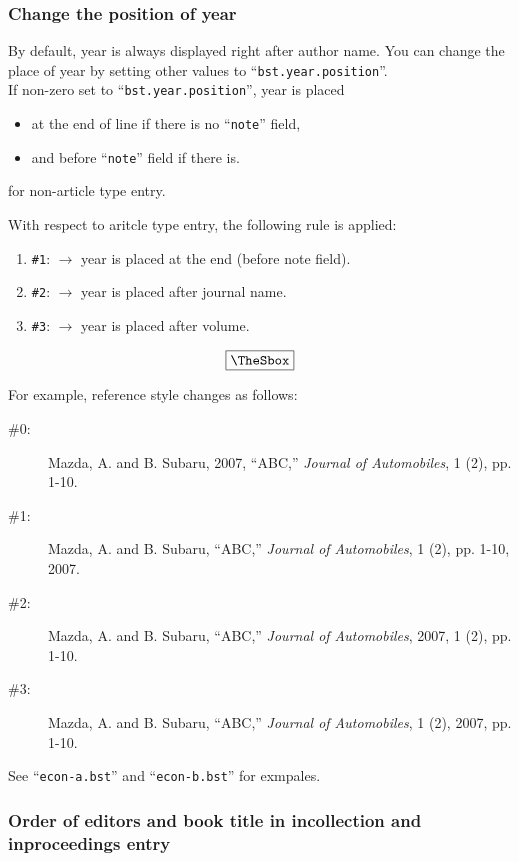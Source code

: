 \documentclass[10pt]{article}
\newenvironment{Frame}%
{\setlength{\fboxsep}{15pt}
\setlength{\mylength}{\linewidth}%
\addtolength{\mylength}{-2\fboxsep}%
\addtolength{\mylength}{-2\fboxrule}%
\Sbox
\minipage{\mylength}%
\setlength{\abovedisplayskip}{0pt}%
\setlength{\belowdisplayskip}{0pt}%
}%
{\endminipage\endSbox
\[\fbox{\TheSbox}\]}
\begin{document}
\subsubsection{Change the position of year}

By default, year is always displayed right after author name.  You can
change the place of year by setting other values to
``\texttt{bst.year.position}''.
\\

If non-zero set to ``\texttt{bst.year.position}'', year is placed
\begin{itemize}
 \item at the end of line if there is no ``\texttt{note}'' field, 
 \item and before ``\texttt{note}'' field if there is.
\end{itemize}
for non-article type entry.

With respect to aritcle type entry, the following rule is applied:
\begin{Frame}
\begin{enumerate}
 \item \verb|#1|: $\rightarrow$ year is placed at the end (before note field).
 \item \verb|#2|: $\rightarrow$ year is placed after journal name.
 \item \verb|#3|: $\rightarrow$ year is placed after volume.
\end{enumerate}
\end{Frame}

For example, reference style changes as follows:
\begin{description}
 \item[\#0: ] Mazda, A. and B. Subaru, 2007, ``ABC,'' \textit{Journal of
            Automobiles}, 1 (2), pp. 1-10.
 \item[\#1: ] Mazda, A. and B. Subaru, ``ABC,'' \textit{Journal of Automobiles},
            1 (2), pp. 1-10, 2007.
 \item[\#2: ] Mazda, A. and B. Subaru, ``ABC,'' \textit{Journal of Automobiles},
            2007, 1 (2), pp. 1-10.
 \item[\#3: ] Mazda, A. and B. Subaru, ``ABC,'' \textit{Journal of Automobiles},
            1 (2), 2007, pp. 1-10.
\end{description}

See ``\texttt{econ-a.bst}'' and ``\texttt{econ-b.bst}'' for exmpales.


\subsubsection{Order of editors and book title in incollection and inproceedings entry}
\end{document}
